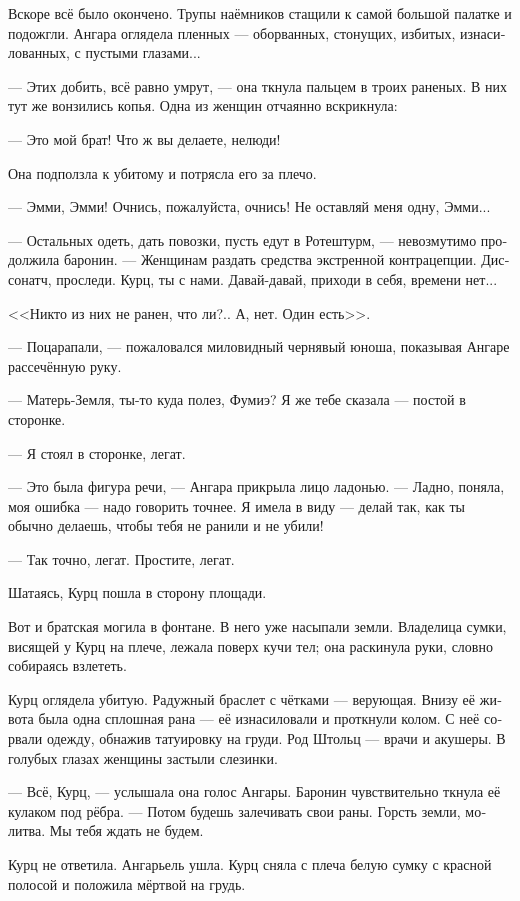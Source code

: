 \documentclass[a4paper,12pt,fleqn]{book}\usepackage{cooltooltips}\usepackage{polyglossia}\setdefaultlanguage[babelshorthands=true]{russian}\setotherlanguage{english}\defaultfontfeatures{Ligatures=TeX,Mapping=tex-text} \usepackage{xcolor}\definecolor{lightgray}{HTML}{bbbbbb}\color{lightgray}\newcommand{\ml}[3]{\textenglish{\textcolor{black}{#3}}}
\begin{document}
Вскоре всё было окончено.
Трупы наёмников стащили к самой большой палатке и подожгли.
Ангара оглядела пленных --- оборванных, стонущих, избитых, изнасилованных, с пустыми глазами...

--- Этих добить, всё равно умрут, --- она ткнула пальцем в троих раненых.
В них тут же вонзились копья.
Одна из женщин отчаянно вскрикнула:

--- Это мой брат!
Что ж вы делаете, нелюди!

Она подползла к убитому и потрясла его за плечо.

--- Эмми, Эмми!
Очнись, пожалуйста, очнись!
Не оставляй меня одну, Эмми...

--- Остальных одеть, дать повозки, пусть едут в Ротештурм, --- невозмутимо продолжила баронин.
--- Женщинам раздать средства экстренной контрацепции.
Диссонатч, проследи.
Курц, ты с нами.
Давай-давай, приходи в себя, времени нет...

<<Никто из них не ранен, что ли?..
А, нет.
Один есть>>.

--- Поцарапали, --- пожаловался миловидный чернявый юноша, показывая Ангаре рассечённую руку.

--- Матерь-Земля, ты-то куда полез, Фумиэ?
Я же тебе сказала --- постой в сторонке.

--- Я стоял в сторонке, легат.

--- Это была фигура речи, --- Ангара прикрыла лицо ладонью.
--- Ладно, поняла, моя ошибка --- надо говорить точнее.
Я имела в виду --- делай так, как ты обычно делаешь, чтобы тебя не ранили и не убили!

--- Так точно, легат.
Простите, легат.

Шатаясь, Курц пошла в сторону площади.

Вот и братская могила в фонтане.
В него уже насыпали земли.
Владелица сумки, висящей у Курц на плече, лежала поверх кучи тел;
она раскинула руки, словно собираясь взлететь.

Курц оглядела убитую.
Радужный браслет с чётками --- верующая.
Внизу её живота была одна сплошная рана --- её изнасиловали и проткнули колом.
С неё сорвали одежду, обнажив татуировку на груди.
Род Штольц --- врачи и акушеры.
В голубых глазах женщины застыли слезинки.

--- Всё, Курц, --- услышала она голос Ангары.
Баронин чувствительно ткнула её кулаком под рёбра.
--- Потом будешь залечивать свои раны.
Горсть земли, молитва.
Мы тебя ждать не будем.

Курц не ответила.
Ангарьель ушла.
Курц сняла с плеча белую сумку с красной полосой и положила мёртвой на грудь.
\end{document}

